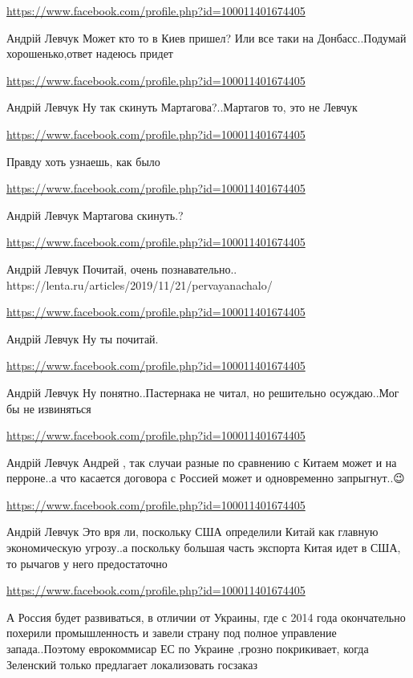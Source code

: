 \documentclass[a4paper,11pt]{extreport}
\begin{document}
\begin{itemize}
\begin{itemize}
\url{https://www.facebook.com/profile.php?id=100011401674405}

Андрій Левчук Может кто то в Киев пришел? Или все таки на Донбасс..Подумай хорошенько,ответ надеюсь придет

\url{https://www.facebook.com/profile.php?id=100011401674405}

Андрій Левчук Ну так скинуть Мартагова?..Мартагов то, это не Левчук

\url{https://www.facebook.com/profile.php?id=100011401674405}

Правду хоть узнаешь, как было

\url{https://www.facebook.com/profile.php?id=100011401674405}

Андрій Левчук Мартагова скинуть.?

\url{https://www.facebook.com/profile.php?id=100011401674405}

Андрій Левчук Почитай, очень познавательно.. https://lenta.ru/articles/2019/11/21/pervayanachalo/

\url{https://www.facebook.com/profile.php?id=100011401674405}

Андрій Левчук Ну ты почитай.

\url{https://www.facebook.com/profile.php?id=100011401674405}

Андрій Левчук Ну понятно..Пастернака не читал, но решительно осуждаю..Мог бы не извиняться

\url{https://www.facebook.com/profile.php?id=100011401674405}

Андрій Левчук Андрей , так случаи разные по сравнению с Китаем может и на перроне..а что касается договора с Россией может и одновременно запрыгнут..😉

\url{https://www.facebook.com/profile.php?id=100011401674405}

Андрій Левчук Это вря ли, поскольку США определили Китай как главную экономическую угрозу..а поскольку большая часть экспорта Китая идет в США, то рычагов у него предостаточно

\url{https://www.facebook.com/profile.php?id=100011401674405}

А Россия будет развиваться, в отличии от Украины, где с 2014 года окончательно похерили промышленность и завели страну под полное управление запада..Поэтому еврокоммисар ЕС по Украине ,грозно покрикивает, когда Зеленский только предлагает локализовать госзаказ


\end{itemize}
\end{itemize}
\end{document}
